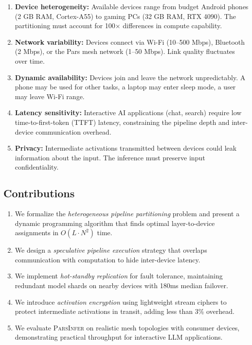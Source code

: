 \documentclass[11pt,a4paper]{article}
\newcommand{\parsdi}{\textsc{ParsInfer}\xspace}
\begin{document}
\begin{enumerate}[label=(\arabic*)]
    \item \textbf{Device heterogeneity:} Available devices range from budget Android phones (2 GB RAM, Cortex-A55) to gaming PCs (32 GB RAM, RTX 4090). The partitioning must account for 100$\times$ differences in compute capability.
    \item \textbf{Network variability:} Devices connect via Wi-Fi (10--500 Mbps), Bluetooth (2 Mbps), or the Pars mesh network (1--50 Mbps). Link quality fluctuates over time.
    \item \textbf{Dynamic availability:} Devices join and leave the network unpredictably. A phone may be used for other tasks, a laptop may enter sleep mode, a user may leave Wi-Fi range.
    \item \textbf{Latency sensitivity:} Interactive AI applications (chat, search) require low time-to-first-token (TTFT) latency, constraining the pipeline depth and inter-device communication overhead.
    \item \textbf{Privacy:} Intermediate activations transmitted between devices could leak information about the input. The inference must preserve input confidentiality.
\end{enumerate}

\subsection{Contributions}

\begin{enumerate}[label=(\roman*)]
    \item We formalize the \emph{heterogeneous pipeline partitioning} problem and present a dynamic programming algorithm that finds optimal layer-to-device assignments in $O(L \cdot N^2)$ time.
    \item We design a \emph{speculative pipeline execution} strategy that overlaps communication with computation to hide inter-device latency.
    \item We implement \emph{hot-standby replication} for fault tolerance, maintaining redundant model shards on nearby devices with 180ms median failover.
    \item We introduce \emph{activation encryption} using lightweight stream ciphers to protect intermediate activations in transit, adding less than 3\% overhead.
    \item We evaluate \parsdi on realistic mesh topologies with consumer devices, demonstrating practical throughput for interactive LLM applications.
\end{enumerate}
\end{document}
